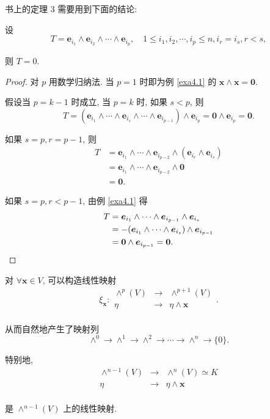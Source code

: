 \documentclass[color=black,device=normal,lang=cn,mode=geye]{elegantnote}
\begin{document}
书上的定理 3 需要用到下面的结论:
\begin{theorem}\label{t4.2}
    设
    \[T=\boldsymbol{e}_{i_1}\land\boldsymbol{e}_{i_2}\land\cdots\land\boldsymbol{e}_{i_p},\quad1\leq i_1,i_2,\cdots,i_p\leq n,i_r=i_s,r<s,\]

    则 $T=0$.
\end{theorem}
\begin{proof}
    对 $p$ 用数学归纳法. 当 $p=1$ 时即为例 \ref{exa4.1} 的 $\boldsymbol{x}\land\boldsymbol{x}=\boldsymbol{0}$.

    假设当 $p=k-1$ 时成立, 当 $p=k$ 时, 如果 $s<p$, 则
    \[T=(\boldsymbol{e}_{i_1}\land\cdots\land\boldsymbol{e}_{i_s}\land\cdots\land\boldsymbol{e}_{i_{p-1}})\land\boldsymbol{e}_{i_p}=\boldsymbol{0}\land\boldsymbol{e}_{i_p}=\boldsymbol{0}.\]

    如果 $s=p,r=p-1$, 则
    \begin{align*}
        T & =\boldsymbol{e}_{i_1}\land\cdots\land\boldsymbol{e}_{i_{p-2}}\land(\boldsymbol{e}_{i_r}\land\boldsymbol{e}_{i_s}) \\
        & =\boldsymbol{e}_{i_1}\land\cdots\land\boldsymbol{e}_{i_{p-2}}\land\boldsymbol{0} \\
        & =\boldsymbol{0}.
    \end{align*}

    如果 $s=p,r<p-1$, 由例 \ref{exa4.1} 得
    \begin{align*}
        T & =\boldsymbol{e}_{i_1}\land\cdots\land\boldsymbol{e}_{i_{p-1}}\land\boldsymbol{e}_{i_s} \\
        & =-(\boldsymbol{e}_{i_1}\land\cdots\land\boldsymbol{e}_{i_s})\land\boldsymbol{e}_{i_{p-1}} \\
        & =\boldsymbol{0}\land\boldsymbol{e}_{i_{p-1}}=\boldsymbol{0}.\qedhere
    \end{align*}
\end{proof}
\begin{example}
    对 $\forall\boldsymbol{x}\in V$, 可以构造线性映射
    \[\xi_{\boldsymbol{x}}:\begin{array}{rcl}
        \wedge^p(V) & \rightarrow & \wedge^{p+1}(V) \\
        \eta & \rightarrow & \eta\wedge\boldsymbol{x} \\
    \end{array}.\]

    从而自然地产生了映射列
    \[\wedge^0\to\wedge^1\to\wedge^2\to\cdots\to\wedge^n\to\{0\}.\]

    特别地,
    \[\begin{array}{rcl}
        \wedge^{n-1}(V) & \rightarrow & \wedge^n(V)\simeq K \\
        \eta & \rightarrow & \eta\wedge\boldsymbol{x} \\
    \end{array}\]

    是 $\wedge^{n-1}(V)$ 上的线性映射.
\end{example}
\end{document}

